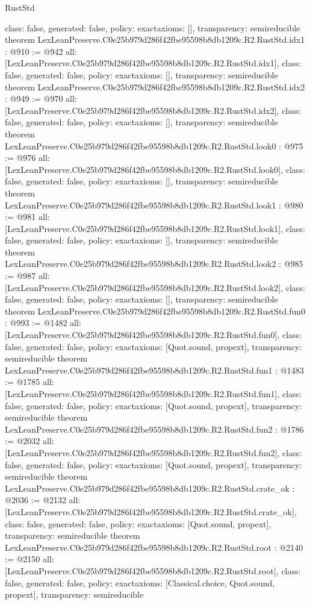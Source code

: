 \begin{lexlean}{RustStd}
\begin{coremodule}
{  class: false,
  generated: false,
  policy: exact{axioms: []},
  transparency: semireducible
}
theorem LexLeanPreserve.C0e25b979d286f42fbe95598b8db1209c.R2.RustStd.idx1 : @910 := @942 {
  all: [LexLeanPreserve.C0e25b979d286f42fbe95598b8db1209c.R2.RustStd.idx1],
  class: false,
  generated: false,
  policy: exact{axioms: []},
  transparency: semireducible
}
theorem LexLeanPreserve.C0e25b979d286f42fbe95598b8db1209c.R2.RustStd.idx2 : @949 := @970 {
  all: [LexLeanPreserve.C0e25b979d286f42fbe95598b8db1209c.R2.RustStd.idx2],
  class: false,
  generated: false,
  policy: exact{axioms: []},
  transparency: semireducible
}
theorem LexLeanPreserve.C0e25b979d286f42fbe95598b8db1209c.R2.RustStd.look0 : @975 := @976 {
  all: [LexLeanPreserve.C0e25b979d286f42fbe95598b8db1209c.R2.RustStd.look0],
  class: false,
  generated: false,
  policy: exact{axioms: []},
  transparency: semireducible
}
theorem LexLeanPreserve.C0e25b979d286f42fbe95598b8db1209c.R2.RustStd.look1 : @980 := @981 {
  all: [LexLeanPreserve.C0e25b979d286f42fbe95598b8db1209c.R2.RustStd.look1],
  class: false,
  generated: false,
  policy: exact{axioms: []},
  transparency: semireducible
}
theorem LexLeanPreserve.C0e25b979d286f42fbe95598b8db1209c.R2.RustStd.look2 : @985 := @987 {
  all: [LexLeanPreserve.C0e25b979d286f42fbe95598b8db1209c.R2.RustStd.look2],
  class: false,
  generated: false,
  policy: exact{axioms: []},
  transparency: semireducible
}
theorem LexLeanPreserve.C0e25b979d286f42fbe95598b8db1209c.R2.RustStd.fun0 : @993 := @1482 {
  all: [LexLeanPreserve.C0e25b979d286f42fbe95598b8db1209c.R2.RustStd.fun0],
  class: false,
  generated: false,
  policy: exact{axioms: [Quot.sound, propext]},
  transparency: semireducible
}
theorem LexLeanPreserve.C0e25b979d286f42fbe95598b8db1209c.R2.RustStd.fun1 : @1483 := @1785 {
  all: [LexLeanPreserve.C0e25b979d286f42fbe95598b8db1209c.R2.RustStd.fun1],
  class: false,
  generated: false,
  policy: exact{axioms: [Quot.sound, propext]},
  transparency: semireducible
}
theorem LexLeanPreserve.C0e25b979d286f42fbe95598b8db1209c.R2.RustStd.fun2 : @1786 := @2032 {
  all: [LexLeanPreserve.C0e25b979d286f42fbe95598b8db1209c.R2.RustStd.fun2],
  class: false,
  generated: false,
  policy: exact{axioms: [Quot.sound, propext]},
  transparency: semireducible
}
theorem LexLeanPreserve.C0e25b979d286f42fbe95598b8db1209c.R2.RustStd.crate_ok : @2036 := @2132 {
  all: [LexLeanPreserve.C0e25b979d286f42fbe95598b8db1209c.R2.RustStd.crate_ok],
  class: false,
  generated: false,
  policy: exact{axioms: [Quot.sound, propext]},
  transparency: semireducible
}
theorem LexLeanPreserve.C0e25b979d286f42fbe95598b8db1209c.R2.RustStd.root : @2140 := @2150 {
  all: [LexLeanPreserve.C0e25b979d286f42fbe95598b8db1209c.R2.RustStd.root],
  class: false,
  generated: false,
  policy: exact{axioms: [Classical.choice, Quot.sound, propext]},
  transparency: semireducible
}


\end{coremodule}
\end{lexlean}
